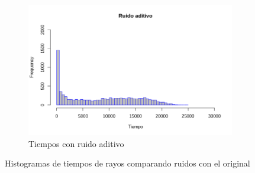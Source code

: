 \documentclass[11pt]{beamer}
\begin{document}
\begin{frame}
\begin{figure}[H]
\begin{subfigure}[h]{0.45\textwidth}
            \includegraphics[width=\textwidth]{img/ruidoAditivo.png}
            \caption{Tiempos con ruido aditivo}
            \label{fig:Tiempos con ruido aditivo}
        \end{subfigure}
        
        \caption{Histogramas de tiempos de rayos comparando ruidos con el original}
    \end{figure}
\end{frame}
\end{document}
